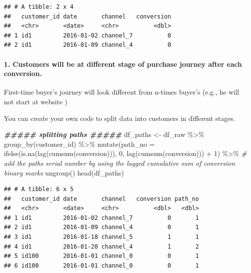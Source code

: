 \documentclass[
]{book}
\newenvironment{Shaded}{\begin{snugshade}}{\end{snugshade}}
\newcommand{\AttributeTok}[1]{\textcolor[rgb]{0.77,0.63,0.00}{#1}}
\newcommand{\CommentTok}[1]{\textcolor[rgb]{0.56,0.35,0.01}{\textit{#1}}}
\newcommand{\DecValTok}[1]{\textcolor[rgb]{0.00,0.00,0.81}{#1}}
\newcommand{\DocumentationTok}[1]{\textcolor[rgb]{0.56,0.35,0.01}{\textbf{\textit{#1}}}}
\newcommand{\FunctionTok}[1]{\textcolor[rgb]{0.00,0.00,0.00}{#1}}
\newcommand{\NormalTok}[1]{#1}
\newcommand{\OtherTok}[1]{\textcolor[rgb]{0.56,0.35,0.01}{#1}}
\newcommand{\SpecialCharTok}[1]{\textcolor[rgb]{0.00,0.00,0.00}{#1}}
\begin{document}
\begin{verbatim}
## # A tibble: 2 x 4
##   customer_id date       channel   conversion
##   <chr>       <date>     <chr>          <dbl>
## 1 id1         2016-01-02 channel_7          0
## 2 id1         2016-01-09 channel_4          0
\end{verbatim}

\hypertarget{customers-will-be-at-different-stage-of-purchase-journey-after-each-conversion.}{%
\paragraph{1. Customers will be at different stage of purchase journey after each conversion.}\label{customers-will-be-at-different-stage-of-purchase-journey-after-each-conversion.}}

First-time buyer's journey will look different from n-times buyer's (e.g., he will not start at website )

You can create your own code to split data into customers in different stages.

\begin{Shaded}
\begin{Highlighting}[]
\DocumentationTok{\#\#\#\#\# splitting paths \#\#\#\#\#}
\NormalTok{df\_paths }\OtherTok{\textless{}{-}}\NormalTok{ df\_raw }\SpecialCharTok{\%\textgreater{}\%}
        \FunctionTok{group\_by}\NormalTok{(customer\_id) }\SpecialCharTok{\%\textgreater{}\%}
        \FunctionTok{mutate}\NormalTok{(}\AttributeTok{path\_no =} \FunctionTok{ifelse}\NormalTok{(}\FunctionTok{is.na}\NormalTok{(}\FunctionTok{lag}\NormalTok{(}\FunctionTok{cumsum}\NormalTok{(conversion))), }\DecValTok{0}\NormalTok{, }\FunctionTok{lag}\NormalTok{(}\FunctionTok{cumsum}\NormalTok{(conversion))) }\SpecialCharTok{+} \DecValTok{1}\NormalTok{) }\SpecialCharTok{\%\textgreater{}\%} \CommentTok{\# add the path\textquotesingle{}s serial number by using the lagged cumulative sum of conversion binary marks}
        \FunctionTok{ungroup}\NormalTok{()}
\FunctionTok{head}\NormalTok{(df\_paths)}
\end{Highlighting}
\end{Shaded}

\begin{verbatim}
## # A tibble: 6 x 5
##   customer_id date       channel   conversion path_no
##   <chr>       <date>     <chr>          <dbl>   <dbl>
## 1 id1         2016-01-02 channel_7          0       1
## 2 id1         2016-01-09 channel_4          0       1
## 3 id1         2016-01-18 channel_5          1       1
## 4 id1         2016-01-20 channel_4          1       2
## 5 id100       2016-01-01 channel_0          0       1
## 6 id100       2016-01-01 channel_0          0       1
\end{verbatim}
\end{document}

